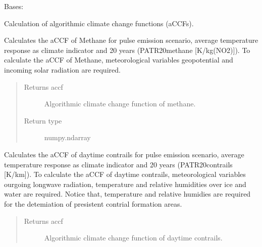 \documentclass[a4paper,11pt,english]{sphinxmanual}
\begin{document}
\begin{fulllineitems}
\label{\detokenize{envlib:envlib.accf.CalAccf}}
\sphinxAtStartPar
Bases: 

\sphinxAtStartPar
Calculation of algorithmic climate change functions (aCCFs).

\begin{fulllineitems}
\label{\detokenize{envlib:envlib.accf.CalAccf.accf_ch4}}
\sphinxAtStartPar
Calculates the aCCF of Methane for pulse emission scenario, average temperature response as climate
indicator and 20 years (P\sphinxhyphen{}ATR20\sphinxhyphen{}methane {[}K/kg(NO2){]}). To calculate the aCCF of Methane, meteorological
variables geopotential and incoming solar radiation are required.
\begin{quote}\begin{description}
\item[{Returns accf}] \leavevmode
\sphinxAtStartPar
Algorithmic climate change function of methane.

\item[{Return type}] \leavevmode
\sphinxAtStartPar
numpy.ndarray

\end{description}\end{quote}

\end{fulllineitems}


\begin{fulllineitems}
\label{\detokenize{envlib:envlib.accf.CalAccf.accf_dcontrail}}
\sphinxAtStartPar
Calculates the aCCF of day\sphinxhyphen{}time contrails for pulse emission scenario, average temperature response as
climate indicator and 20 years (P\sphinxhyphen{}ATR20\sphinxhyphen{}contrails {[}K/km{]}). To calculate the aCCF of day\sphinxhyphen{}time contrails,
meteorological variables ourgoing longwave radiation, temperature and relative humidities over ice and water
are required. Notice that, temperature and relative humidies are required for the detemiation of presistent
contrial formation areas.
\begin{quote}\begin{description}
\item[{Returns accf}] \leavevmode
\sphinxAtStartPar
Algorithmic climate change function of day\sphinxhyphen{}time contrails.


\end{description}
\end{quote}
\end{fulllineitems}
\end{fulllineitems}
\end{document}
